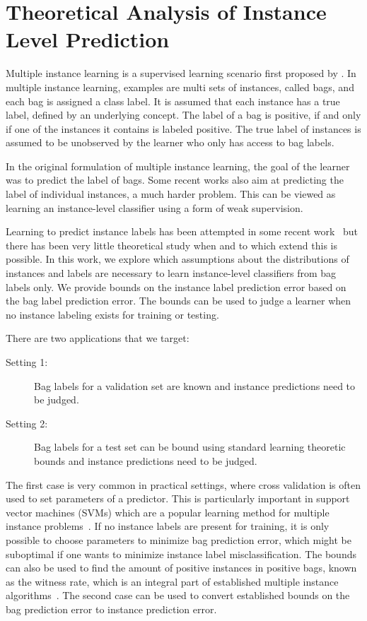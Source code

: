 \section{Theoretical Analysis of Instance Level Prediction}
Multiple instance learning is a supervised learning scenario first proposed by \citet{dietterich1997solving}.
In multiple instance learning, examples are multi sets of instances, called bags, and each bag is assigned a class label.
It is assumed that each instance has a true label, defined by an underlying concept. The label of a bag is positive, if and only if one of
the instances it contains is labeled positive. The true label of instances is assumed to be unobserved by the learner who only has access to bag labels.

In the original formulation of multiple instance learning, the goal of the learner
was to predict the label of bags. Some recent works also aim at predicting
the label of individual instances, a much harder problem.
This can be viewed as learning an instance-level classifier using a form of weak supervision.

Learning to predict instance labels has been attempted in some recent work~\citep{liconvex2010,zhang2002dd}
but there has been very little theoretical study when and to which extend this is possible.
In this work, we explore which assumptions about the distributions of instances and labels
are necessary to learn instance-level classifiers from bag labels only.
We provide bounds on the instance label prediction error based on the
bag label prediction error. The bounds can be used to judge a learner when no
instance labeling exists for training or testing.

There are two applications that we target:
\begin{description}
\item[Setting 1:] Bag labels for a validation set are known and instance predictions need to be judged.
\item[Setting 2:] Bag labels for a test set can be bound using standard learning theoretic bounds and instance
predictions need to be judged.
\end{description}
The first case is very common in practical settings, where
cross validation is often used to set parameters of a predictor. This is
particularly important in support vector machines (SVMs) which are a popular
learning method for multiple instance problems~\citep{andrews2003support}.
If no instance labels are present for training, it is only possible to
choose parameters to minimize bag prediction error, which might be suboptimal if one
wants to minimize instance label misclassification. 
The bounds can also be used to find the amount of positive instances in positive bags,
known as the witness rate, which is an integral part of established multiple
instance algorithms~\citep{zhang2002dd,liconvex2010}.
The second case can be used to convert established bounds on the bag prediction error
to instance prediction error.


